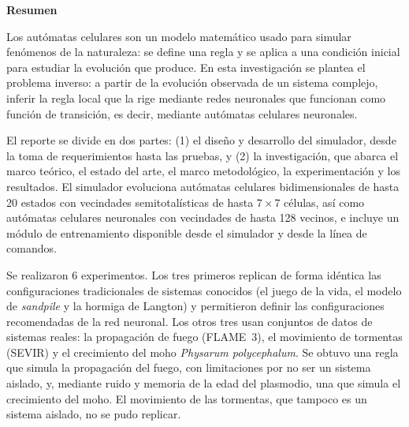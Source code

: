 \thispagestyle{empty}

\vspace*{1cm}
{\centering \Large \textbf{Resumen}\par}
\vspace{0.8cm}

Los autómatas celulares son un modelo matemático usado para simular fenómenos de la naturaleza: se define una regla y se aplica a una condición inicial para estudiar la evolución que produce. En esta investigación se plantea el problema inverso: a partir de la evolución observada de un sistema complejo, inferir la regla local que la rige mediante redes neuronales que funcionan como función de transición, es decir, mediante autómatas celulares neuronales.

El reporte se divide en dos partes: (1) el diseño y desarrollo del simulador, desde la toma de requerimientos hasta las pruebas, y (2) la investigación, que abarca el marco teórico, el estado del arte, el marco metodológico, la experimentación y los resultados. El simulador evoluciona autómatas celulares bidimensionales de hasta 20 estados con vecindades semitotalísticas de hasta $7 \times 7$ células, así como autómatas celulares neuronales con vecindades de hasta 128 vecinos, e incluye un módulo de entrenamiento disponible desde el simulador y desde la línea de comandos.

Se realizaron 6 experimentos. Los tres primeros replican de forma idéntica las configuraciones tradicionales de sistemas conocidos (el juego de la vida, el modelo de \textit{sandpile} y la hormiga de Langton) y permitieron definir las configuraciones recomendadas de la red neuronal. Los otros tres usan conjuntos de datos de sistemas reales: la propagación de fuego (FLAME~3), el movimiento de tormentas (SEVIR) y el crecimiento del moho \textit{Physarum polycephalum}. Se obtuvo una regla que simula la propagación del fuego, con limitaciones por no ser un sistema aislado, y, mediante ruido y memoria de la edad del plasmodio, una que simula el crecimiento del moho. El movimiento de las tormentas, que tampoco es un sistema aislado, no se pudo replicar.

\clearpage
